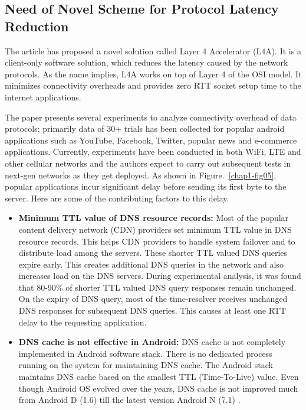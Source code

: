 \begin{multicols}{2}
\subsection{Need of Novel Scheme for Protocol Latency Reduction}

The article \cite{art1-key13} has proposed a novel solution called Layer 4 Accelerator (L4A). It is a client-only software solution, which reduces the latency caused by the network protocols. As the name implies, L4A works on top of Layer 4 of the OSI model. It minimizes connectivity overheads and provides zero RTT socket setup time to the internet applications.

The paper \cite{art1-key13} presents several experiments to analyze connectivity overhead of data protocols; primarily data of 30+ trials has been collected for popular android applications such as YouTube, Facebook, Twitter, popular news and e-commerce applications. Currently, experiments have been conducted in both WiFi, LTE  and other cellular networks and the authors expect to carry out subsequent tests in next-gen networks as they get deployed.  As shown in Figure.~\ref{chap1-fig05}, popular applications incur significant delay before sending its first byte to the server. Here are some of the contributing factors \cite{art1-key13} to this delay.
\begin{itemize}
\item  {\bf Minimum TTL value of DNS resource records:} Most of the popular content delivery network (CDN) providers set minimum TTL value in DNS resource records. This helps CDN providers to handle system failover and to distribute load among the servers. These shorter TTL valued DNS queries expire early. This creates additional DNS queries in the network and also increases load on the DNS servers. During experimental analysis, it was found that 80-90$\%$ of shorter TTL valued DNS query responses remain unchanged. On the expiry of DNS query, most of the time-resolver receives unchanged DNS responses for subsequent DNS queries. This causes at least one RTT delay to the requesting application.
\item{\bf DNS cache is not effective in Android:} DNS cache is not completely implemented in Android software stack. There is no dedicated process running on the system for maintaining DNS cache. The Android stack maintains DNS cache based on the smallest TTL (Time-To-Live) value. Even though Android OS evolved over the years, DNS cache is not improved much from Android D (1.6) till the latest version Android N (7.1) \cite{art1-key14}. 

\end{itemize}
\end{multicols}
